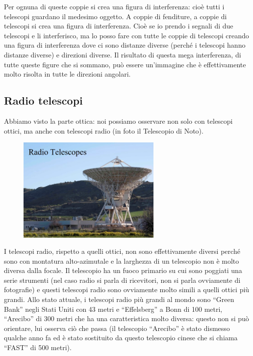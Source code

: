 \documentclass[a4paper,11pt]{article}
\begin{document}
Per ognuna di queste coppie si crea una figura di interferenza: cioè tutti i telescopi guardano il medesimo oggetto. A coppie di fenditure, a coppie di telescopi si crea una figura di interferenza. 
Cioè se io prendo i segnali di due telescopi e li interferisco, ma lo posso fare con tutte le coppie di telescopi creando una figura di interferenza dove ci sono distanze diverse (perché i telescopi hanno distanze diverse) e direzioni diverse. Il risultato di questa mega interferenza, di tutte queste figure che si sommano, può essere un’immagine che è effettivamente molto risolta in tutte le direzioni angolari.
\newpage
\subsection{Radio telescopi}
Abbiamo visto la parte ottica: noi possiamo osservare non solo con telescopi ottici, ma anche con telescopi radio (in foto il Telescopio di Noto). 

\begin{figure}[h!!]
        \centering
        \includegraphics[width=7cm]{31.jpg}
        \label{}
    \end{figure}

I telescopi radio, rispetto a quelli ottici, non sono effettivamente diversi perché sono con montatura alto-azimutale e la larghezza di un telescopio non è molto diversa dalla focale. Il telescopio ha un fuoco primario su cui sono poggiati una serie strumenti (nel caso radio si parla di ricevitori, non si parla ovviamente di fotografie) e questi telescopi radio sono ovviamente molto simili a quelli ottici più grandi. Allo stato attuale, i telescopi radio più grandi al mondo sono “Green Bank” negli Stati Uniti con 43 metri e “Effelsberg” a Bonn di 100 metri, “Arecibo” di 300 metri che ha una caratteristica molto diversa: questo non si può orientare, lui osserva ciò che passa (il telescopio “Arecibo” è stato dismesso qualche anno fa ed è stato sostituito da questo telescopio cinese che si chiama “FAST” di 500 metri). 
\end{document}
